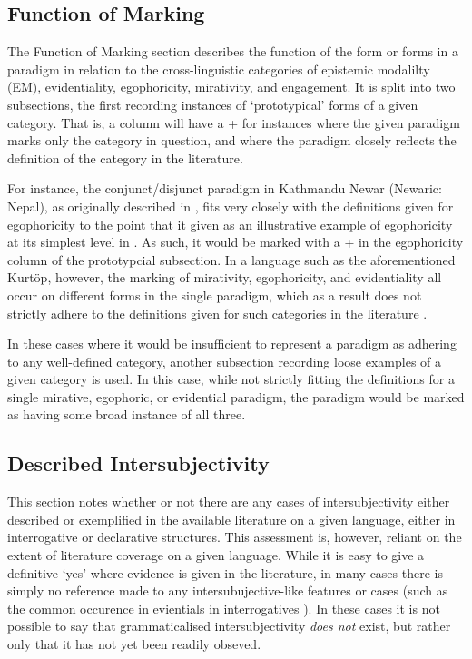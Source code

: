 \subsection{Function of Marking}
The Function of Marking section describes the function of the form or forms in a paradigm in relation to the cross-linguistic categories of epistemic modalilty (EM), evidentiality, egophoricity, mirativity, and engagement. It is split into two subsections, the first recording instances of `prototypical' forms of a given category. That is, a column will have a + for instances where the given paradigm marks only the category in question, and where the paradigm closely reflects the definition of the category in the literature.

For instance, the conjunct/disjunct paradigm in Kathmandu Newar (Newaric: Nepal), as originally described in , fits very closely with the definitions given for egophoricity to the point that it given as an illustrative example of egophoricity at its simplest level in . As such, it would be marked with a + in the egophoricity column of the prototypcial subsection. In a language such as the aforementioned Kurtöp, however, the marking of mirativity, egophoricity, and evidentiality all occur on different forms in the single paradigm, which as a result does not strictly adhere to the definitions given for such categories in the literature \cites{DeLancey2012}{EgoIntro}{Aikhenvald2018Intro}.

In these cases where it would be insufficient to represent a paradigm as adhering to any well-defined category, another subsection recording loose examples of a given category is used. In this case, while not strictly fitting the definitions for a single mirative, egophoric, or evidential paradigm, the paradigm would be marked as having some broad instance of all three.

\subsection{Described Intersubjectivity}
This section notes whether or not there are any cases of intersubjectivity either described or exemplified in the available literature on a given language, either in interrogative or declarative structures. This assessment is, however, reliant on the extent of literature coverage on a given language. While it is easy to give a definitive `yes' where evidence is given in the literature, in many cases there is simply no reference made to any intersubujective-like features or cases (such as the common occurence in evientials in interrogatives \cite{Aikhenvald2018Intro}). In these cases it is not possible to say that grammaticalised intersubjectivity \textit{does not} exist, but rather only that it has not yet been readily obseved.

